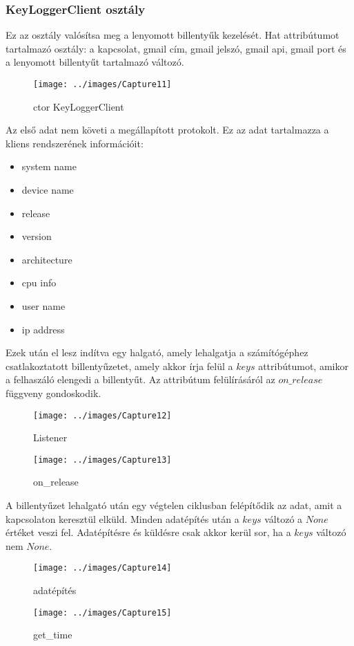 \documentclass[a4paper, 11pt]{article}
\begin{document}
\subsubsection{KeyLoggerClient osztály}\label{subsubsec:keyloggerclientclass}
Ez az osztály valósítsa meg a lenyomott billentyűk kezelését. Hat attribútumot tartalmazó osztály: a kapcsolat, gmail cím, gmail jelszó, gmail api, gmail port és a lenyomott billentyűt tartalmazó változó.
\begin{figure}[H]
\centering
\texttt{[image: ../images/Capture11]}
\caption{ctor KeyLoggerClient}
\label{fig:ctorkeyloggerclient}
\end{figure}
Az első adat nem követi a megállapított protokolt. Ez az adat tartalmazza a kliens rendszerének információit:
\begin{itemize}
\item system name
\item device name
\item release
\item version
\item architecture
\item cpu info
\item user name
\item ip address
\end{itemize}
Ezek után el lesz indítva egy halgató, amely lehalgatja a számítógéphez csatlakoztatott billentyűzetet, amely akkor írja felül a $keys$ attribútumot, amikor a felhaszáló elengedi a billentyűt. Az attribútum felülírásáról az $on\_release$ függveny gondoskodik.
\begin{figure}[H]
\centering
\texttt{[image: ../images/Capture12]}
\caption{Listener}
\label{fig:listener}
\end{figure}
\begin{figure}[H]
\centering
\texttt{[image: ../images/Capture13]}
\caption{on\_release}
\label{fig:onrelease}
\end{figure}

A billentyűzet lehalgató után egy végtelen ciklusban felépítődik az adat, amit a kapcsolaton keresztül elküld. Minden adatépítés után a $keys$ változó a $None$ értéket veszi fel. Adatépítésre és küldésre csak akkor kerül sor, ha a $keys$ változó nem $None$.
\begin{figure}[H]
\centering
\texttt{[image: ../images/Capture14]}
\caption{adatépítés}
\label{fig:databuild}
\end{figure}
\begin{figure}[H]
\centering
\texttt{[image: ../images/Capture15]}
\caption{get\_time}
\label{fig:gettime}
\end{figure}
\end{document}
